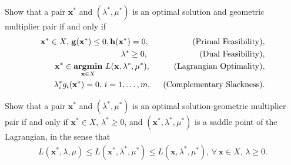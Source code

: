 \documentclass[11pt,letter,notitlepage]{article}
\DeclareMathOperator*{\argmin}{\bf argmin}
\begin{document}
\newpage
\begin{exercise}
	Show that a pair $\mathbf{x}^*$ and $(\lambda^*,\mu^*)$ is an optimal solution and geometric multiplier pair if and only if
	\begin{align}\label{cond:primal-feasibility}
		\mathbf{x}^*\in X,\,\mathbf{g}(\mathbf{x}^*)\leq0,\mathbf{h}(\mathbf{x}^*)=0,\hspace{18.5mm}(\mbox{\textup{Primal Feasibility}}), & \\ \label{cond:dual-feasibility}
		\lambda^*\geq0,\hspace{22mm}(\mbox{\textup{Dual Feasibility}}),                                                                   & \\ \label{cond:lagrangian-optimality}
		\mathbf{x}^*\in\argmin_{\mathbf{x}\in X}\,L(\mathbf{x},\lambda^*,\mu^*),\hspace{10mm}(\mbox{\textup{Lagrangian Optimality}}),     & \\ \label{cond:complementary-slackness}
		\lambda^*_ig_i(\mathbf{x}^*)=0,\,i=1,\ldots,m,\hspace{5mm}(\mbox{\textup{Complementary Slackness}}).                              &
	\end{align}
\end{exercise}


\newpage
\begin{exercise}
	Show that a pair $\mathbf{x}^*$ and $(\lambda^*,\mu^*)$ is an optimal solution-geometric multiplier pair if and only if $\mathbf{x}^*\in X$, $\lambda^*\geq0$, and $(\mathbf{x}^*,\lambda^*,\mu^*)$ is a saddle point of the Lagrangian, in the sense that
	\begin{align}\label{cond:saddle-Lagrangian}
		L(\mathbf{x}^*,\lambda,\mu)\leq L(\mathbf{x}^*,\lambda^*,\mu^*)\leq L(\mathbf{x},\lambda^*,\mu^*),\,\forall\,\mathbf{x}\in X,\,\lambda\geq0.
	\end{align}
\end{exercise}
\end{document}
